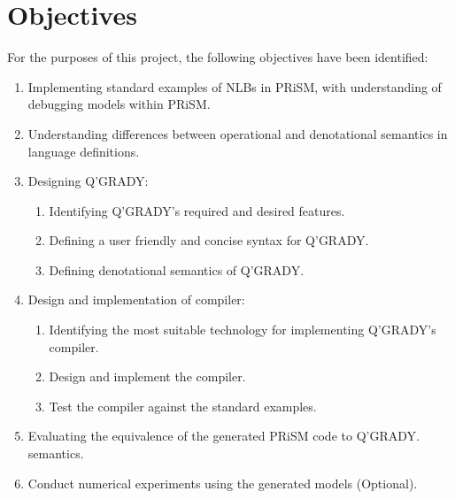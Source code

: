 \documentclass[11pt, a4paper]{article}
\begin{document}
\section{Objectives} %
\label{sec:objectives}
For the purposes of this project, the following objectives have been identified:
\begin{enumerate}
    \item Implementing standard examples of NLBs in PRiSM, with understanding of
    debugging models within PRiSM.
    \item Understanding differences between operational and denotational
    semantics in language definitions.
    \item Designing Q'GRADY:
    \begin{enumerate}
        \item Identifying Q'GRADY's required and desired features.
        \item Defining a user friendly and concise syntax for Q'GRADY.
        \item Defining denotational semantics of Q'GRADY.
    \end{enumerate}
    \item Design and implementation of compiler:
    \begin{enumerate}
        \item Identifying the most suitable technology for implementing
        Q'GRADY's compiler.
        \item Design and implement the compiler.
        \item Test the compiler against the standard examples.
    \end{enumerate}
    \item Evaluating the equivalence of the generated PRiSM code to Q'GRADY.
    semantics.
    \item Conduct numerical experiments using the generated models (Optional).
\end{enumerate}

\end{document}
